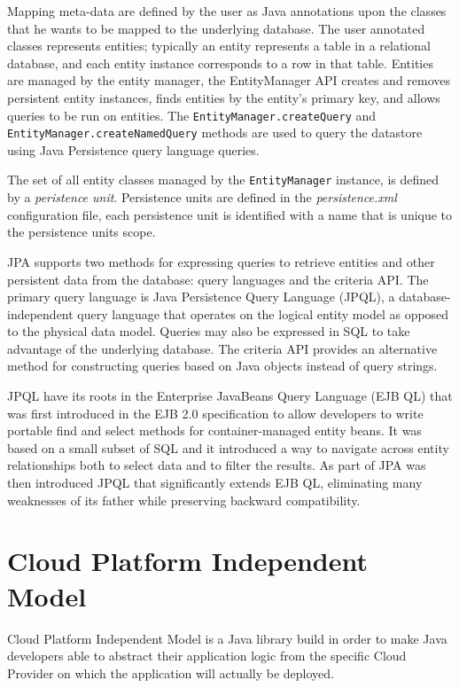\noindent Mapping meta-data are defined by the user as Java annotations upon the classes that he wants to be mapped to the underlying database.
The user annotated classes represents entities; typically an entity represents a table in a relational database, and each entity instance corresponds to a row in that table. Entities are managed by the entity manager, the EntityManager API creates and removes persistent entity instances, finds entities by the entity’s primary key, and allows queries to be run on entities. 
The \texttt{EntityManager.createQuery} and \texttt{EntityManager.createNamedQuery} methods are used to query the datastore using Java Persistence query language queries. 

\noindent The set of all entity classes managed by the \texttt{EntityManager} instance, is defined by a \textit{peristence unit}.
Persistence units are defined in the \textit{persistence.xml} configuration file, each persistence unit is identified with a name that is unique to the persistence units scope. 

\newparagraph JPA supports two methods for expressing queries to retrieve entities and other persistent data from the database: query languages and the criteria API. The primary query language is Java Persistence Query Language (JPQL), a database-independent query language that operates on the logical entity model as opposed to the physical data model. Queries may also be expressed in SQL to take advantage of the underlying database. The criteria API provides an alternative method for constructing queries based on Java objects instead of query strings.

\noindent JPQL have its roots in the Enterprise JavaBeans Query Language (EJB QL) that was first introduced in the EJB 2.0 specification to allow developers to write portable find and select methods for container-managed entity beans. It was based on a small subset of SQL and it introduced a way to navigate across entity relationships both to select data and to filter the results.
As part of JPA was then introduced JPQL that significantly extends EJB QL, eliminating many weaknesses of its father while preserving backward compatibility.

\section{Cloud Platform Independent Model}
\label{sec:cpim}
Cloud Platform Independent Model \cite{thesis:cpim} is a Java library build in order to make Java developers able to abstract their application logic from the specific Cloud Provider on which the application will actually be deployed.

